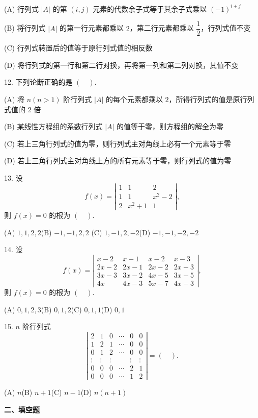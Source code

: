 \documentclass[UTF8, 12pt, fontset=fandol, oneside]{ctexart}
\begin{document}
(A) 行列式 $|A|$ 的第 $(i,j)$ 元素的代数余子式等于其余子式乘以 $(-1)^{i+j}$

(B) 将行列式 $|A|$ 的第一行元素都乘以 $2$，第二行元素都乘以 $\dfrac12$，行列式值不变

(C) 行列式转置后的值等于原行列式值的相反数

(D) 将行列式的第一行和第二行对换，再将第一列和第二列对换，其值不变

12. 下列论断正确的是 $(\quad)$.

(A) 将 $n(n>1)$ 阶行列式 $|A|$ 的每个元素都乘以 $2$，所得行列式的值是原行列式值的 $2$ 倍

(B) 某线性方程组的系数行列式 $|A|$ 的值等于零，则方程组的解全为零

(C) 若上三角行列式的值为零，则行列式主对角线上必有一个元素等于零

(D) 若上三角行列式主对角线上方的所有元素等于零，则行列式的值为零

13. 设
\[
f(x)=\left|\begin{array}{ccc}
1&1&2\\
1&1&x^2-2\\
2&x^2+1&1
\end{array}\right|,
\]
则 $f(x)=0$ 的根为 $(\quad)$.

(A) $1,1,2,2$\qquad (B) $-1,-1,2,2$\qquad
(C) $1,-1,2,-2$\qquad (D) $-1,-1,-2,-2$

14. 设
\[
f(x)=\left|\begin{array}{cccc}
x-2&x-1&x-2&x-3\\
2x-2&2x-1&2x-2&2x-3\\
3x-3&3x-2&4x-5&3x-5\\
4x&4x-3&5x-7&4x-3
\end{array}\right|,
\]
则 $f(x)=0$ 的根为 $(\quad)$.

(A) $0,1,2,3$\qquad (B) $0,1,2$\qquad (C) $0,1,1$\qquad (D) $0,1$

15. $n$ 阶行列式
\[
\left|\begin{array}{cccccc}
2&1&0&\cdots&0&0\\
1&2&1&\cdots&0&0\\
0&1&2&\cdots&0&0\\
\vdots&\vdots&\vdots&&\vdots&\vdots\\
0&0&0&\cdots&2&1\\
0&0&0&\cdots&1&2
\end{array}\right|=(\quad).
\]

(A) $n$\qquad (B) $n+1$\qquad (C) $n-1$\qquad (D) $n(n+1)$

\noindent\textbf{二、填空题}
\end{document}
